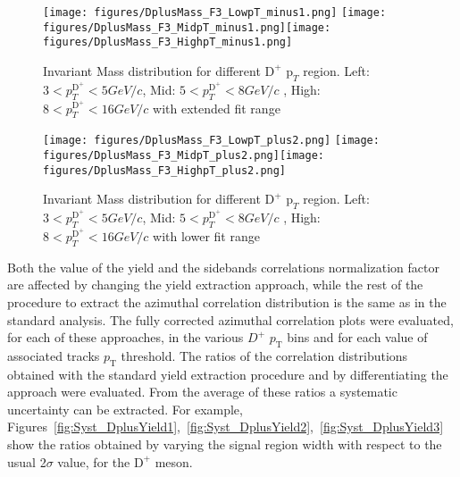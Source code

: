 \begin{figure}
\centering
{\texttt{[image: figures/DplusMass\_F3\_LowpT\_minus1.png]}}
{\texttt{[image: figures/DplusMass\_F3\_MidpT\_minus1.png]}}{\texttt{[image: figures/DplusMass\_F3\_HighpT\_minus1.png]}}
 \caption{Invariant Mass distribution for different $\text{D}^+$ $\text{p}_T$ region. Left: $3< p_{T}^{\text{D}^+}< 5 GeV/c$, Mid: $5< p_{T}^{\text{D}^+}< 8 GeV/c$ , High: $8< p_{T}^{\text{D}^+}< 16 GeV/c$ with extended fit range }
\label{fig:DplusMassPlots3}
\end{figure}

\begin{figure}
\centering
{\texttt{[image: figures/DplusMass\_F3\_LowpT\_plus2.png]}}
{\texttt{[image: figures/DplusMass\_F3\_MidpT\_plus2.png]}}{\texttt{[image: figures/DplusMass\_F3\_HighpT\_plus2.png]}}
 \caption{Invariant Mass distribution for different $\text{D}^+$ $\text{p}_T$ region. Left: $3< p_{T}^{\text{D}^+}< 5 GeV/c$, Mid: $5< p_{T}^{\text{D}^+}< 8 GeV/c$ , High: $8< p_{T}^{\text{D}^+}< 16 GeV/c$ with lower fit range }
\label{fig:DplusMassPlots4}
\end{figure}

Both the value of the yield and the sidebands correlations normalization factor are affected by changing the yield extraction approach, while the rest of the procedure to extract the azimuthal correlation distribution is the same as in the standard analysis. The fully corrected azimuthal correlation plots were evaluated, for each of these approaches, in the various $D^+$ $p_\text{T}$ bins and for each value of associated tracks $p_\text{T}$ threshold.
The ratios of the correlation distributions obtained with the standard yield extraction procedure and by differentiating the approach were evaluated. From the average of these ratios a systematic uncertainty can be extracted.
For example, Figures~\ref{fig:Syst_DplusYield1},~\ref{fig:Syst_DplusYield2},~\ref{fig:Syst_DplusYield3} show the ratios obtained by varying the signal region width with respect to the usual 2$\sigma$ value, for the $\text{D}^+$ meson.

